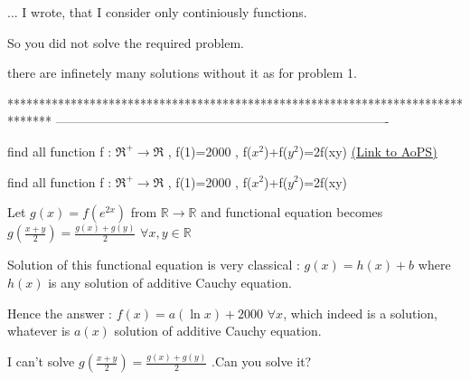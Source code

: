 \begin{solution}
	\begin{tcolorbox}...
I wrote, that I consider only continiously functions.\end{tcolorbox}
So you did not solve the required problem.
\end{solution}



\begin{solution}
	there are infinetely many solutions without it as for problem 1.
\end{solution}
*******************************************************************************
-------------------------------------------------------------------------------

\begin{problem}
	find all function f : $\Re^+ \rightarrow \Re$ , f(1)=2000 , f($x^2$)+f($y^2$)=2f(xy)
	\flushright \href{https://artofproblemsolving.com/community/c6h573927}{(Link to AoPS)}
\end{problem}



\begin{solution}
	\begin{tcolorbox}find all function f : $\Re^+ \rightarrow \Re$ , f(1)=2000 , f($x^2$)+f($y^2$)=2f(xy)\end{tcolorbox}
Let $g(x)=f(e^{2x})$ from $\mathbb R\to\mathbb R$ and functional equation becomes $g(\frac{x+y}2)=\frac{g(x)+g(y)}2$ $\forall x,y\in\mathbb R$

Solution of this functional equation is very classical  : $g(x)=h(x)+b$ where $h(x)$ is any solution of additive Cauchy equation.

Hence the answer : $\boxed{f(x)=a(\ln x)+2000}$ $\forall x$, which indeed is a solution, whatever is $a(x)$ solution of additive Cauchy equation.
\end{solution}



\begin{solution}
	I can't solve  $g(\frac{x+y}2)=\frac{g(x)+g(y)}2$ .Can you solve it?
\end{solution}



